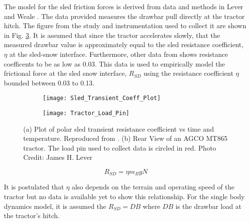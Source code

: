 The model for the sled friction forces is derived from data and methods in Lever and Weale \cite{lever2012high}. The data provided measures the drawbar pull directly at the tractor hitch. The figure from the study and instrumentation used to collect it are shown in Fig. \ref{fig:Sled_Data}. It is assumed that since the tractor accelerates slowly, that the measured drawbar value is approximately equal to the sled resistance coefficient, $\eta$ at the sled-snow interface. Furthermore, other data from \cite{lever2012high} shows resistance coefficents to be as low as $0.03$. This data is used to empirically model the frictional force at the sled snow interface, $R_{SD}$ using the resistance coefficient $\eta$ bounded between 0.03 to 0.13.
\begin{figure}[htb]
\begin{subfigure}{0.6\textwidth}
\centering
\texttt{[image: Sled\_Transient\_Coeff\_Plot]} 
\caption{}
\label{fig:Sled_Transient_Coeff_Plot}
\end{subfigure}
\begin{subfigure}{0.5\textwidth}
\centering
\texttt{[image: Tractor\_Load\_Pin]}
\caption{}
\label{fig:Tractor_Load_Pin}
\end{subfigure}
\caption{(a) Plot of polar sled transient resistance coefficient vs time and temperature. Reproduced from \cite{lever2012high}. (b) Rear View of an AGCO MT865 tractor. The load pin used to collect data is circled in red. Photo Credit: James H. Lever}
\label{fig:Sled_Data}
\end{figure}
\begin{linenomath*}
    \begin{equation} \label{eq:resistanceSled}
        R_{SD} = \eta m_B g N
    \end{equation}
\end{linenomath*} 
It is postulated that $\eta$ also depends on the terrain and operating speed of the tractor but no data is available yet to show this relationship. For the single body dynamics model, it is assumed the $R_{SD} = DB$ where $DB$ is the drawbar load at the tractor's hitch.